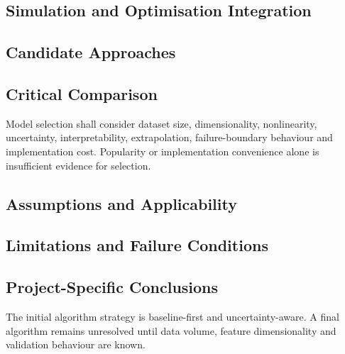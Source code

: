 \subsection{Simulation and Optimisation Integration}
\label{sec:res-ml-alg-simulation-optimisation-integration}


\subsection{Candidate Approaches}
\label{sec:res-ml-alg-candidate-approaches}


\subsection{Critical Comparison}
\label{sec:res-ml-alg-critical-comparison}

Model selection shall consider dataset size, dimensionality, nonlinearity,
uncertainty, interpretability, extrapolation, failure-boundary behaviour and
implementation cost. Popularity or implementation convenience alone is
insufficient evidence for selection.

\subsection{Assumptions and Applicability}
\label{sec:res-ml-alg-assumptions}


\subsection{Limitations and Failure Conditions}
\label{sec:res-ml-alg-limitations}


\subsection{Project-Specific Conclusions}
\label{sec:res-ml-alg-conclusions}

The initial algorithm strategy is baseline-first and uncertainty-aware. A final
algorithm remains unresolved until data volume, feature dimensionality and
validation behaviour are known.

